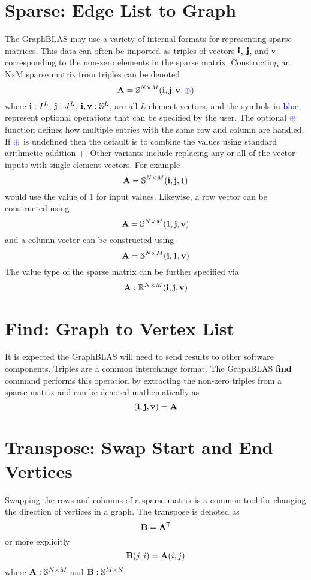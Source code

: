 \section{Sparse: Edge List to Graph}
  The GraphBLAS may use a variety of internal formats for representing sparse matrices.  This data can often be imported as triples of vectors ${\bf i}$, ${\bf j}$, and ${\bf v}$ corresponding to the non-zero elements in the sparse matrix.  Constructing an NxM sparse matrix from triples can be denoted
$$
   \mathbf{A} = \mathbb{S}^{N \times M}({\bf i},{\bf j},{\bf v},{\textcolor{blue}{\oplus}})
$$
where ${\bf i} : I^L$, ${\bf j}: J^L$, ${\bf i}, {\bf v}: \mathbb{S}^L$, are all $L$ element vectors, and the symbols in \textcolor{blue}{blue} represent optional operations that can be specified by the user.  The optional  ${\textcolor{blue}{\oplus}}$ function defines how multiple entries with the same row and column are handled.  If ${\textcolor{blue}{\oplus}}$ is undefined then the default is to combine the values using standard arithmetic addition $+$.  Other variants include replacing any or all of the vector inputs with single element vectors.  For example
$$
   \mathbf{A} = \mathbb{S}^{N \times M}({\bf i},{\bf j},1)
$$
would use the value of $1$ for input values.  Likewise, a row vector can be constructed using
$$
   \mathbf{A} = \mathbb{S}^{N \times M}(1,{\bf j},{\bf v})
$$
and a column vector can be constructed using
$$
   \mathbf{A} = \mathbb{S}^{N \times M}({\bf i},1,{\bf v})
$$
The value type of the sparse matrix can be further specified via
$$
   \mathbf{A}: \mathbb{R}^{N \times M}({\bf i},{\bf j},{\bf v})
$$

\section{Find: Graph to Vertex List}
  It is expected the GraphBLAS will need to send results to other software components.  Triples are a common interchange format.  The GraphBLAS {\bf find} command performs this operation by extracting the non-zero triples from a sparse matrix and can be denoted mathematically as
$$
	({\bf i},{\bf j},{\bf v}) = {\bf A}
$$

\section{Transpose: Swap Start and End Vertices}
  Swapping the rows and columns of a sparse matrix is a common tool for changing the direction of vertices in a graph.  The transpose is denoted as
$$
     {\bf B} = {\bf A}^{\sf T}
$$   
or more explicitly
$$
     {\bf B}(j,i) = {\bf A}(i,j)
$$   
where ${\bf A}:\mathbb{S}^{N \times M}$ and ${\bf B}:\mathbb{S}^{M \times N}$

